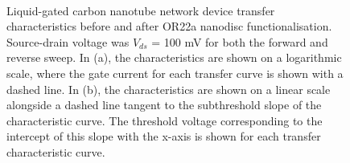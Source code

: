 \documentclass[
  a4paper,
]{scrbook}
\begin{document}
\begin{figure}
\begin{minipage}[t]{0.45\linewidth}
{{}

}

\end{minipage}%
%
\begin{minipage}[t]{0.01\linewidth}

{\centering 

~

}

\end{minipage}%

\caption{\label{fig-OR22a-TX-comparison}Liquid-gated carbon nanotube
network device transfer characteristics before and after OR22a nanodisc
functionalisation. Source-drain voltage was \(V_{ds}\) = 100 mV for both
the forward and reverse sweep. In (a), the characteristics are shown on
a logarithmic scale, where the gate current for each transfer curve is
shown with a dashed line. In (b), the characteristics are shown on a
linear scale alongside a dashed line tangent to the subthreshold slope
of the characteristic curve. The threshold voltage corresponding to the
intercept of this slope with the x-axis is shown for each transfer
characteristic curve.}

\end{figure}
\end{document}
